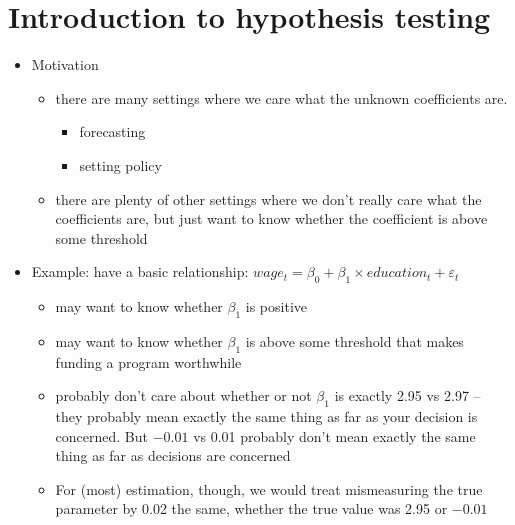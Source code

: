 

\part*{Introduction to hypothesis testing}%

\begin{itemize}
\item Motivation
\begin{itemize}
\item there are many settings where we care what the unknown
       coefficients are.
\begin{itemize}
\item forecasting
\item setting policy
\end{itemize}
\item there are plenty of other settings where we don't really care what
       the coefficients are, but just want to know whether the
       coefficient is above some threshold
\end{itemize}
\item Example: have a basic relationship: $wage_t = \beta_0 + \beta_1
     \times education_t + \varepsilon_t$
\begin{itemize}
\item may want to know whether $\beta_1$ is positive
\item may want to know whether $\beta_1$ is above some threshold that
       makes funding a program worthwhile
\item probably don't care about whether or not $\beta_1$ is exactly
       2.95 vs 2.97 -- they probably mean exactly the same thing as far
       as your decision is concerned.  But $-0.01$ vs 0.01 probably don't
       mean exactly the same thing as far as decisions are concerned
\item For (most) estimation, though, we would treat mismeasuring the
       true parameter by 0.02 the same, whether the true value was 2.95
       or $-0.01$
\end{itemize}
\end{itemize}

